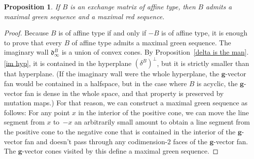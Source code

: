 \documentclass{amsart}
\newtheorem{proposition}{Proposition}[section]
\theoremstyle{definition}
\theoremstyle{remark}
\numberwithin{equation}{section}
\newcommand{\0}{{\mathbf{0}}}
\newcommand{\g}{\mathbf{g}}
\renewcommand{\d}{{\mathfrak d}}
\begin{document}
\begin{proposition}\label{aff red}
If $B$ is an exchange matrix of affine type, then $B$ admits a maximal green sequence and a maximal red sequence.
\end{proposition}
\begin{proof}  
Because $B$ is of affine type if and only if $-B$ is of affine type, it is enough to prove that every $B$ of affine type admits a maximal green sequence.
The imaginary wall $\d^B_\infty$ is a union of convex cones.
By Proposition~\ref{delta is the man}.\ref{im hyp}, it is contained in the hyperplane $(\delta^B)^\perp$, but it is strictly smaller than that hyperplane.
(If the imaginary wall were the whole hyperplane, the $\g$-vector fan would be contained in a halfspace, but in the case where $B$ is acyclic, the $\g$-vector fan is dense in the whole space, and that property is preserved by mutation maps.) 
For that reason, we can construct a maximal green sequence as follows:
For any point $x$ in the interior of the positive cone, we can move the line segment from $x$ to~$-x$ an arbitrarily small amount to obtain a line segment from the positive cone to the negative cone that is contained in the interior of the $\g$-vector fan and doesn't pass through any codimension-$2$ faces of the $\g$-vector fan.
The $\g$-vector cones visited by this define a maximal green sequence.
\end{proof}
\end{document}
